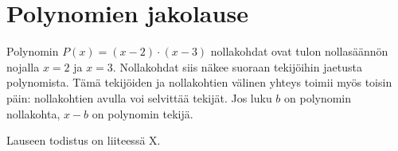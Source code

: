 \chapter{Polynomien jakolause}

Polynomin $P(x)=(x-2)\cdot(x-3)$ nollakohdat ovat tulon nollasäännön nojalla $x=2$ ja $x=3$. Nollakohdat siis näkee suoraan tekijöihin jaetusta polynomista. Tämä tekijöiden ja nollakohtien välinen yhteys toimii myös toisin päin: nollakohtien avulla voi selvittää tekijät. Jos luku $b$ on polynomin nollakohta, $x-b$ on polynomin tekijä.



Lauseen todistus on liiteessä X.


